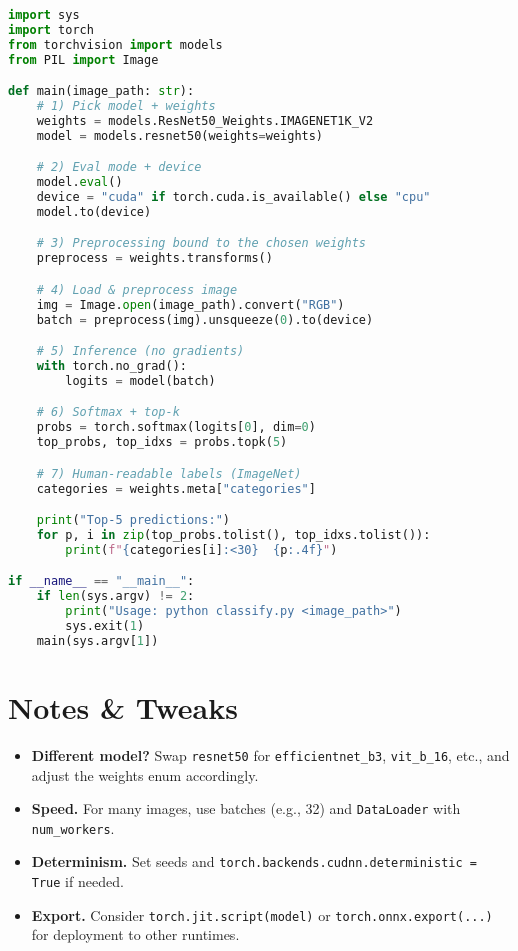 \documentclass[11pt,a4paper]{article}
\begin{document}
\begin{lstlisting}[language=Python,style=code]
import sys
import torch
from torchvision import models
from PIL import Image

def main(image_path: str):
    # 1) Pick model + weights
    weights = models.ResNet50_Weights.IMAGENET1K_V2
    model = models.resnet50(weights=weights)

    # 2) Eval mode + device
    model.eval()
    device = "cuda" if torch.cuda.is_available() else "cpu"
    model.to(device)

    # 3) Preprocessing bound to the chosen weights
    preprocess = weights.transforms()

    # 4) Load & preprocess image
    img = Image.open(image_path).convert("RGB")
    batch = preprocess(img).unsqueeze(0).to(device)

    # 5) Inference (no gradients)
    with torch.no_grad():
        logits = model(batch)

    # 6) Softmax + top-k
    probs = torch.softmax(logits[0], dim=0)
    top_probs, top_idxs = probs.topk(5)

    # 7) Human-readable labels (ImageNet)
    categories = weights.meta["categories"]

    print("Top-5 predictions:")
    for p, i in zip(top_probs.tolist(), top_idxs.tolist()):
        print(f"{categories[i]:<30}  {p:.4f}")

if __name__ == "__main__":
    if len(sys.argv) != 2:
        print("Usage: python classify.py <image_path>")
        sys.exit(1)
    main(sys.argv[1])
\end{lstlisting}

\section*{Notes \& Tweaks}
\begin{itemize}[leftmargin=1.3em]
  \item \textbf{Different model?} Swap \verb|resnet50| for \verb|efficientnet_b3|, \verb|vit_b_16|, etc., and adjust the weights enum accordingly.
  \item \textbf{Speed.} For many images, use batches (e.g., 32) and \verb|DataLoader| with \verb|num_workers|.
  \item \textbf{Determinism.} Set seeds and \verb|torch.backends.cudnn.deterministic = True| if needed.
  \item \textbf{Export.} Consider \verb|torch.jit.script(model)| or \verb|torch.onnx.export(...)| for deployment to other runtimes.
\end{itemize}
\end{document}

